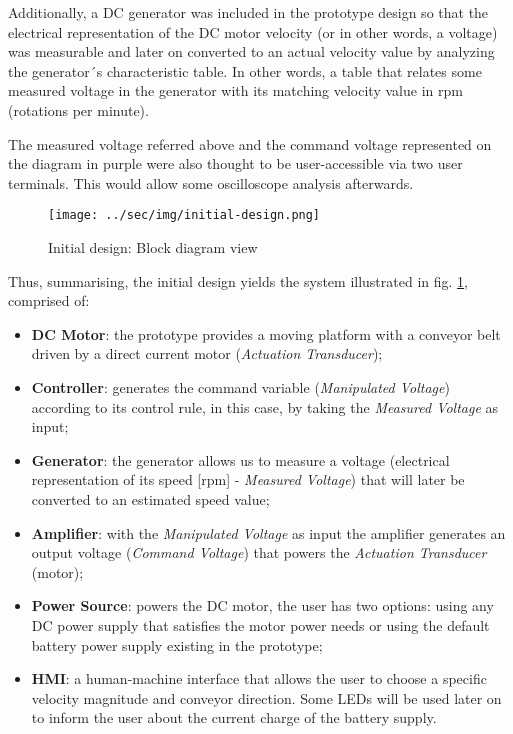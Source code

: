 \documentclass[11pt]{article}
\begin{document}
Additionally, a DC generator was included in the prototype design so
that the electrical representation of the DC motor velocity (or in other words,
a voltage) was measurable and later on converted to an actual velocity value by
analyzing the generator´s characteristic table. In other words, a table that
relates some measured voltage in the generator with its matching velocity value
in rpm (rotations per minute).

The measured voltage referred above and the command voltage represented
on the diagram in purple were also thought to be user-accessible via two
user terminals. This would allow some oscilloscope analysis afterwards.  
\begin{figure}[htbp]
\centering
\texttt{[image: ../sec/img/initial-design.png]}
\caption{\label{fig:initial-design}Initial design: Block diagram view}
\end{figure}

Thus, summarising, the initial design yields the system illustrated in
fig. \ref{fig:initial-design}, comprised of:
\begin{itemize}
\item \textbf{DC Motor}: the prototype provides a moving platform with a conveyor
belt driven by a direct current motor (\emph{Actuation Transducer});
\item \textbf{Controller}: generates the command variable (\emph{Manipulated Voltage})
according to its control rule, in this case, by taking the \emph{Measured
Voltage} as input;
\item \textbf{Generator}: the generator allows us to measure a voltage (electrical
representation of its speed [rpm] - \emph{Measured Voltage}) that will
later be converted to an estimated speed value;
\item \textbf{Amplifier}: with the \emph{Manipulated Voltage} as input the amplifier
generates an output voltage (\emph{Command Voltage}) that powers the
\emph{Actuation Transducer} (motor);
\item \textbf{Power Source}: powers the DC motor, the user has two options: using
any DC power supply that satisfies the motor power needs or using the
default battery power supply existing in the prototype;
\item \textbf{HMI}: a human-machine interface that allows the user to choose a
specific velocity magnitude and conveyor direction. Some LEDs will be
used later on to inform the user about the current charge of the
battery supply.
\end{itemize}
\end{document}
